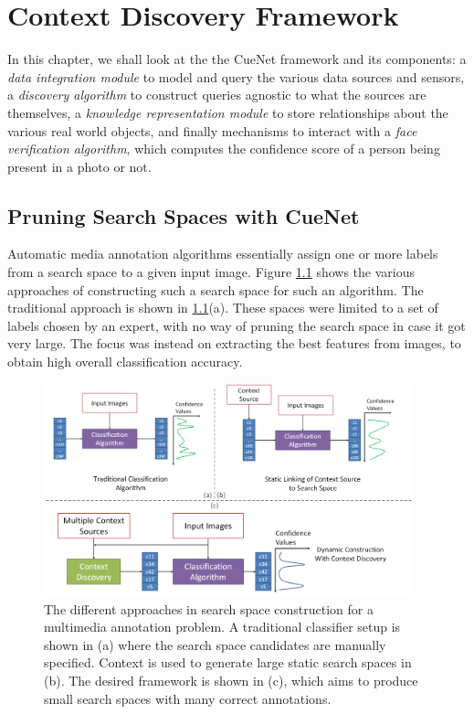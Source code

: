 \chapter{Context Discovery Framework}

In this chapter, we shall look at the the CueNet framework and its components: a \textit{data integration module} to model and query the various data sources and sensors, a \textit{discovery algorithm} to construct queries agnostic to what the sources are themselves, a \textit{knowledge representation module} to store relationships about the various real world objects, and finally mechanisms to interact with a \textit{face verification algorithm}, which computes the confidence score of a person being present in a photo or not.

\section{Pruning Search Spaces with CueNet}

Automatic media annotation algorithms essentially assign one or more labels from a search space to a given input image. Figure \ref{fig:with-without-cuenet} shows the various approaches of constructing such a search space for such an algorithm. The traditional approach is shown in \ref{fig:with-without-cuenet}(a). These spaces were limited to a set of labels chosen by an expert, with no way of pruning the search space in case it got very large. 
The focus was instead on extracting the best features from images, to obtain high overall classification accuracy\cite{turk1991eigenfaces}.

\begin{figure}[t]
\centering
\includegraphics[width=0.95\textwidth]{media/with-without-cuenet-2.png}
\caption{The different approaches in search space construction for a multimedia annotation problem. A traditional classifier setup is shown in (a) where the search space candidates are manually specified. Context is used to generate large static search spaces in (b). The desired framework is shown in (c), which aims to produce small search spaces with many correct annotations.}
\label{fig:with-without-cuenet}
\end{figure}

